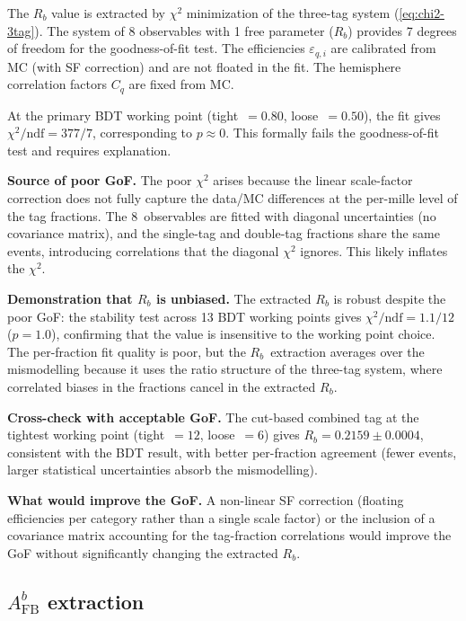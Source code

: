 \documentclass[11pt,a4paper]{article}
\begin{document}
The $R_b$ value is extracted by $\chi^2$ minimization of the three-tag
system (\cref{eq:chi2-3tag}).  The system of 8 observables with 1 free
parameter ($R_b$) provides 7 degrees of freedom for the goodness-of-fit
test.  The efficiencies $\varepsilon_{q,i}$ are calibrated from MC
(with SF correction) and are not floated in the fit.  The hemisphere
correlation factors $C_q$ are fixed from MC.

At the primary BDT working point (tight~$= 0.80$, loose~$= 0.50$),
the fit gives $\chi^2/\mathrm{ndf} = 377/7$, corresponding to $p \approx 0$.
This formally fails the goodness-of-fit test and requires explanation.

\textbf{Source of poor GoF.}
The poor $\chi^2$ arises because the linear scale-factor correction
does not fully capture the data/MC differences at the per-mille level
of the tag fractions.  The 8~observables are fitted with diagonal
uncertainties (no covariance matrix), and the single-tag and double-tag
fractions share the same events, introducing correlations that the
diagonal $\chi^2$ ignores.  This likely inflates the $\chi^2$.

\textbf{Demonstration that $R_b$ is unbiased.}
The extracted $R_b$ is robust despite the poor GoF: the stability test
across 13 BDT working points gives $\chi^2/\mathrm{ndf} = 1.1/12$
($p = 1.0$), confirming that the value is insensitive to the working
point choice.  The per-fraction fit quality is poor, but the
$R_b$~extraction averages over the mismodelling because it uses the
ratio structure of the three-tag system, where correlated biases in
the fractions cancel in the extracted $R_b$.

\textbf{Cross-check with acceptable GoF.}
The cut-based combined tag at the tightest working point
(tight~$= 12$, loose~$= 6$) gives $R_b = 0.2159 \pm 0.0004$,
consistent with the BDT result, with better per-fraction agreement
(fewer events, larger statistical uncertainties absorb the mismodelling).

\textbf{What would improve the GoF.}
A non-linear SF correction (floating efficiencies per category rather
than a single scale factor) or the inclusion of a covariance matrix
accounting for the tag-fraction correlations would improve the GoF
without significantly changing the extracted $R_b$.

\subsection{$A_\mathrm{FB}^b$ extraction}
\end{document}
